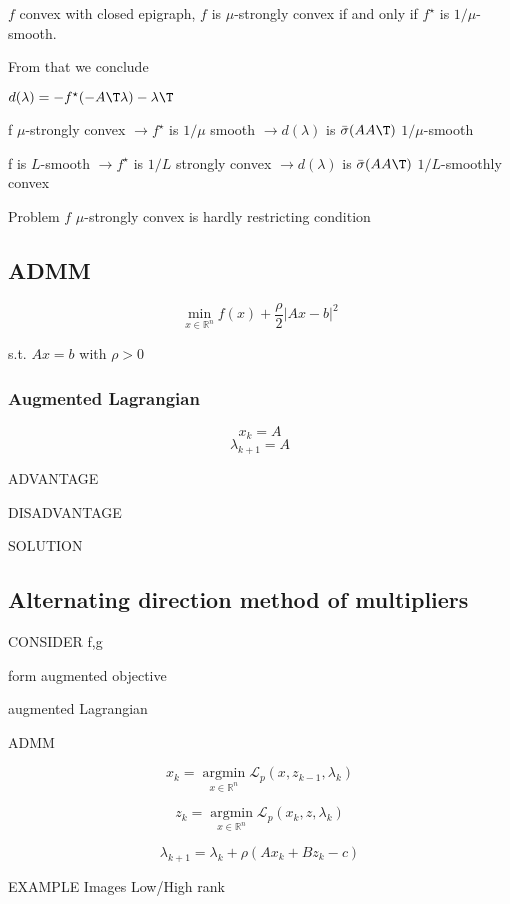 \begin{proposition}
	$f$ convex with closed epigraph, $f$ is $\mu$-strongly convex
	if and only if $f^\star$ is $1/\mu$-smooth.
\end{proposition}

From that we conclude

$d(\lambda) = -f^\star(-A\T\lambda)-\lambda\T$

f $\mu$-strongly convex $\rightarrow f^\star$ is $1/\mu$ smooth
$\rightarrow d(\lambda)$ is $\bar{\sigma}(AA\T)$ $1/\mu$-smooth

f is $L$-smooth $\rightarrow f^\star$ is $1/L$ strongly convex
$\rightarrow d(\lambda)$ is $\bar{\sigma}(AA\T)$ $1/L$-smoothly convex

Problem
$f$ $\mu$-strongly convex is hardly restricting condition

\subsection{ADMM}

$$\min_{x \in \mathbb{R}^{n}}f(x)+ \frac{\rho}{2}|Ax-b|^2 $$

s.t. $Ax=b$ with $\rho > 0$

\subsubsection{Augmented Lagrangian}

$$x_k = A$$
$$\lambda_{k+1} = A$$ %

ADVANTAGE

DISADVANTAGE

SOLUTION
\subsection{Alternating direction method  of multipliers}

CONSIDER f,g

form augmented objective

augmented  Lagrangian

ADMM

$$x_k=\underset{x \in \mathbb{R}^{n} }{\operatorname{argmin}}\mathcal{L}_p(x,z_{k-1},\lambda_k) $$

$$z_k=\underset{x \in \mathbb{R}^{n} }{\operatorname{argmin}}\mathcal{L}_p(x_k,z,\lambda_k) $$

$$ \lambda_{k+1}=\lambda_k+\rho(Ax_k+Bz_k-c)$$

EXAMPLE Images  Low/High rank



